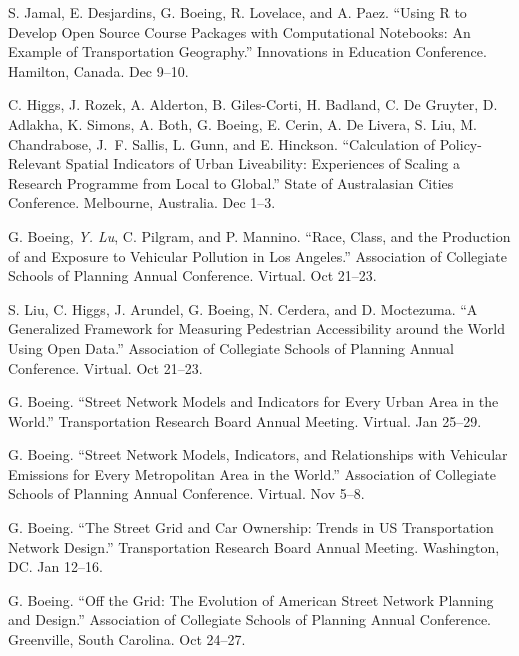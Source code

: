 \documentclass[11pt,a4paper]{report} %
\begin{document}
\begin{tablist}
\item[2021] \tab{}S. Jamal, E. Desjardins, G. Boeing, R. Lovelace, and A. Paez. \enquote{Using R to Develop Open Source Course Packages with Computational Notebooks: An Example of Transportation Geography.} Innovations in Education Conference. Hamilton, Canada. Dec 9--10.

\item[2021] \tab{}C. Higgs, J. Rozek, A. Alderton, B. Giles-Corti, H. Badland, C. De Gruyter, D. Adlakha, K. Simons, A. Both, G. Boeing, E. Cerin, A. De Livera, S. Liu, M. Chandrabose, J.~F. Sallis, L. Gunn, and E. Hinckson. \enquote{Calculation of Policy-Relevant Spatial Indicators of Urban Liveability: Experiences of Scaling a Research Programme from Local to Global.} State of Australasian Cities Conference. Melbourne, Australia. Dec 1--3.

\item[2021] \tab{}G. Boeing, \textit{Y. Lu}, C. Pilgram, and P. Mannino. \enquote{Race, Class, and the Production of and Exposure to Vehicular Pollution in Los Angeles.} Association of Collegiate Schools of Planning Annual Conference. Virtual. Oct 21--23.

\item[2021] \tab{}S. Liu, C. Higgs, J. Arundel, G. Boeing, N. Cerdera, and D. Moctezuma. \enquote{A Generalized Framework for Measuring Pedestrian Accessibility around the World Using Open Data.} Association of Collegiate Schools of Planning Annual Conference. Virtual. Oct 21--23.

\item[2021] \tab{}G. Boeing. \enquote{Street Network Models and Indicators for Every Urban Area in the World.} Transportation Research Board Annual Meeting. Virtual. Jan 25--29.

\item[2020] \tab{}G. Boeing. \enquote{Street Network Models, Indicators, and Relationships with Vehicular Emissions for Every Metropolitan Area in the World.} Association of Collegiate Schools of Planning Annual Conference. Virtual. Nov 5--8.

\item[2020] \tab{}G. Boeing. \enquote{The Street Grid and Car Ownership: Trends in US Transportation Network Design.} Transportation Research Board Annual Meeting. Washington, DC\@. Jan 12--16.

\item[2019] \tab{}G. Boeing. \enquote{Off the Grid: The Evolution of American Street Network Planning and Design.} Association of Collegiate Schools of Planning Annual Conference. Greenville, South Carolina. Oct 24--27.


\end{tablist}
\end{document}
